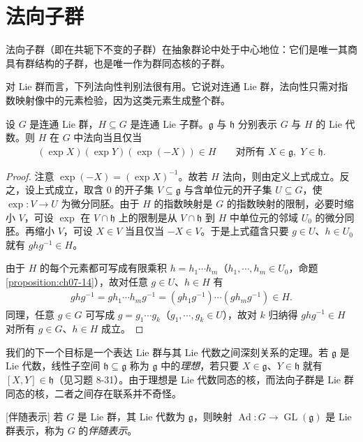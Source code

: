 \documentclass[../../main.tex]{subfiles}
\begin{document}
\section{法向子群}\label{section:ch20-normal-subgroups}

法向子群（即在共轭下不变的子群）在抽象群论中处于中心地位：它们是唯一其商具有群结构的子群，也是唯一作为群同态核的子群。

对 Lie 群而言，下列法向性判别法很有用。它说对连通 Lie 群，法向性只需对指数映射像中的元素检验，因为这类元素生成整个群。

\begin{lemma}\label{lemma:ch20-法向判别}
设 $G$ 是连通 Lie 群，$H\subseteq G$ 是连通 Lie 子群。$\mathfrak g$ 与 $\mathfrak h$ 分别表示 $G$ 与 $H$ 的 Lie 代数。则 $H$ 在 $G$ 中法向当且仅当
\begin{align}
(\exp X)(\exp Y)(\exp(-X))\in H\qquad\text{对所有 }X\in\mathfrak g,\;Y\in\mathfrak h.
\end{align}
\end{lemma}

\begin{proof}
注意 $\exp(-X)=(\exp X)^{-1}$。故若 $H$ 法向，则由定义上式成立。反之，设上式成立，取含 $0$ 的开子集 $V\subseteq\mathfrak g$ 与含单位元的开子集 $U\subseteq G$，使 $\exp\colon V\to U$ 为微分同胚。由于 $H$ 的指数映射是 $G$ 的指数映射的限制，必要时缩小 $V$，可设 $\exp$ 在 $V\cap\mathfrak h$ 上的限制是从 $V\cap\mathfrak h$ 到 $H$ 中单位元的邻域 $U_0$ 的微分同胚。再缩小 $V$，可设 $X\in V$ 当且仅当 $-X\in V$。于是上式蕴含只要 $g\in U$、$h\in U_0$ 就有 $ghg^{-1}\in H$。

由于 $H$ 的每个元素都可写成有限乘积 $h=h_1\cdots h_m$（$h_1,\cdots ,h_m\in U_0$，命题\cref{proposition:ch07-14}），故对任意 $g\in U$、$h\in H$ 有
\begin{align*}
ghg^{-1}=gh_1\cdots h_m g^{-1}=(gh_1g^{-1})\cdots(gh_mg^{-1})\in H.
\end{align*}
同理，任意 $g\in G$ 可写成 $g=g_1\cdots g_k$（$g_1,\cdots ,g_k\in U$），故对 $k$ 归纳得 $ghg^{-1}\in H$ 对所有 $g\in G$、$h\in H$ 成立。
\end{proof}

我们的下一个目标是一个表达 Lie 群与其 Lie 代数之间深刻关系的定理。若 $\mathfrak g$ 是 Lie 代数，线性子空间 $\mathfrak h\subseteq\mathfrak g$ 称为 $\mathfrak g$ 中的\emph{理想}，若只要 $X\in\mathfrak g$、$Y\in\mathfrak h$ 就有 $[X,Y]\in\mathfrak h$（见习题 8-31）。由于理想是 Lie 代数同态的核，而法向子群是 Lie 群同态的核，二者之间存在联系并不奇怪。

\begin{proposition}{[伴随表示]}\label{proposition:ch20-群伴随表示}
若 $G$ 是 Lie 群，其 Lie 代数为 $\mathfrak g$，则映射 $\operatorname{Ad}\colon G\to\operatorname{GL}(\mathfrak g)$ 是 Lie 群表示，称为 $G$ 的\emph{伴随表示}。
\end{proposition}
\end{document}
